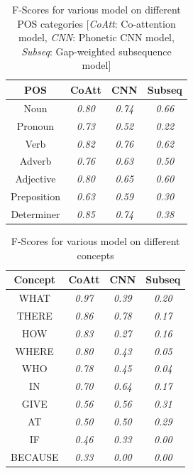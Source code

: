 \documentclass[11pt,letterpaper]{article}
\begin{document}
\begin{table}[h]
\centering
\begin{tabular}{|c|c|c|c|}
\hline
\textbf{POS} & \textbf{CoAtt} & \textbf{CNN} & \textbf{Subseq} \\ \hline
Noun             & \textit{0.80}  & \textit{0.74}  & \textit{0.66}   \\
Pronoun          & \textit{0.73}  & \textit{0.52}  & \textit{0.22}   \\
Verb             & \textit{0.82}  & \textit{0.76}  & \textit{0.62}   \\
Adverb           & \textit{0.76}  & \textit{0.63}  & \textit{0.50}   \\
Adjective        & \textit{0.80}  & \textit{0.65}  & \textit{0.60}   \\
Preposition      & \textit{0.63}  & \textit{0.59}  & \textit{0.30}   \\
Determiner       & \textit{0.85}  & \textit{0.74}  & \textit{0.38}   \\ \hline
\end{tabular}
\caption{F-Scores for various model on different POS categories [\textit{CoAtt}: Co-attention model, \textit{CNN}: Phonetic CNN model, \textit{Subseq}: Gap-weighted subsequence model] }
\label{tbl:pos}
\end{table}

\begin{table}[h]
\centering
\begin{tabular}{|c|c|c|c|}
\hline
\textbf{Concept} & \textbf{CoAtt} & \textbf{CNN} & \textbf{Subseq} \\ \hline
WHAT             & \textit{0.97}  & \textit{0.39}  & \textit{0.20}   \\
THERE            & \textit{0.86}  & \textit{0.78}  & \textit{0.17}   \\
HOW              & \textit{0.83}  & \textit{0.27}  & \textit{0.16}   \\
WHERE            & \textit{0.80}  & \textit{0.43}  & \textit{0.05}   \\
WHO              & \textit{0.78}  & \textit{0.45}  & \textit{0.04}   \\
IN               & \textit{0.70}  & \textit{0.64}  & \textit{0.17}   \\
GIVE             & \textit{0.56}  & \textit{0.56}  & \textit{0.31}   \\
AT               & \textit{0.50}  & \textit{0.50}  & \textit{0.29}   \\
IF               & \textit{0.46}  & \textit{0.33}  & \textit{0.00}   \\
BECAUSE          & \textit{0.33}  & \textit{0.00}  & \textit{0.00}   \\ \hline
\end{tabular}
\caption{F-Scores for various model on different concepts  }
\label{tbl:indconcept}
\end{table}
\end{document}
